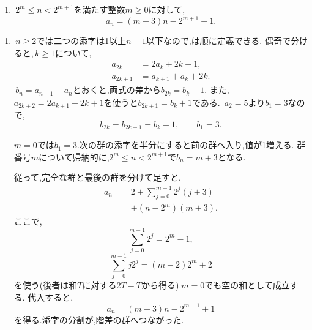     \noindent {}\par\nobreak
    \begin{enumerate}[label=(\arabic*),parsep=3pt,beginpenalty=10000,format=\bookitemlink{example-gauss-role-7}{answer}{problem}]
      \item \,$2^m\le n<2^{m+1}$を満たす整数$m\ge0$に対して,
            \[
              a_n=(m+3)n-2^{m+1}+1.
            \]
    \end{enumerate}

    \noindent {}\par\nobreak
    \begin{enumerate}[label=(\arabic*),parsep=3pt,beginpenalty=10000,format=\bookitemlink{example-gauss-role-7}{solution}{problem}]
      \item \,$n\ge2$では二つの添字は1以上$n-1$以下なので,は順に定義できる.
            偶奇で分けると,\,$k\ge1$について,
            \[
              \begin{aligned}
                a_{2k}&=2a_k+2k-1,\\
                a_{2k+1}&=a_{k+1}+a_k+2k.
              \end{aligned}
            \]
            \,$b_n=a_{n+1}-a_n$とおくと,両式の差から$b_{2k}=b_k+1$.
            また,\,$a_{2k+2}=2a_{k+1}+2k+1$を使うと$b_{2k+1}=b_k+1$である.
            \,$a_2=5$より$b_1=3$なので,
            \[
              b_{2k}=b_{2k+1}=b_k+1,\qquad b_1=3.
            \]

            $m=0$では$b_1=3$.次の群の添字を半分にすると前の群へ入り,値が1増える.
            群番号$m$について帰納的に,$2^m\le n<2^{m+1}$で$b_n=m+3$となる.

            従って,完全な群と最後の群を分けて足すと,
            \begin{align*}
              a_n={}&2+\sum_{j=0}^{m-1}2^j(j+3)\\
                   &+(n-2^m)(m+3).
            \end{align*}
            ここで,
            \[
              \sum_{j=0}^{m-1}2^j=2^m-1,
            \]
            \[
              \sum_{j=0}^{m-1}j2^j=(m-2)2^m+2
            \]
            を使う(後者は和$T$に対する$2T-T$から得る).$m=0$でも空の和として成立する.
            代入すると,
            \[
              a_n=(m+3)n-2^{m+1}+1
            \]
            を得る.添字の分割が,階差の群へつながった.
    \end{enumerate}
